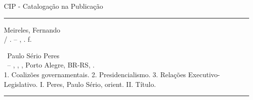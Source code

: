 \begin{fichacatalografica}
\vspace*{15cm} %
\centering CIP - Catalogação na Publicação
\vspace*{0.2cm}
\sffamily
\hrule %
\begin{center} %
\begin{minipage}[c]{12.5cm} %
Meireles, Fernando\\
\hspace*{0.5cm} \imprimirtitulo / \imprimirautor. -- \imprimirlocal, \imprimirdata. \newline
\hspace*{0.5cm} \pageref{LastPage} f.\newline

\hspace*{0.5cm} \imprimirorientadorRotulo ~Paulo Sério Peres\\

\hspace*{0.5cm} \imprimirtipotrabalho ~-- \imprimirinstituicao, \imprimirdepartamento, \imprimirprograma, Porto Alegre, BR-RS, \imprimirdata.\\

\hspace*{0.5cm} 1. Coalizões governamentais. 2. Presidencialismo. 3. Relações Executivo-Legislativo. I. Peres, Paulo Sério, orient. II. Título.
\end{minipage}
\end{center}
\hrule
\end{fichacatalografica}